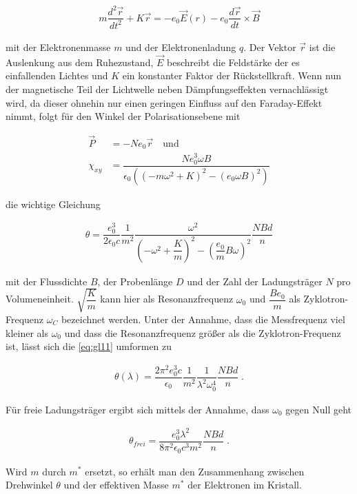     \begin{align*}
    m\dfrac{d^2\vec{r}}{dt^2}+K\vec{r}=-e_0\vec{E}(r)-e_0\dfrac{d\vec{r}}{dt}\times\vec{B}
    \end{align*}

    mit der Elektronenmasse $m$ und der Elektronenladung $q$. Der Vektor $\vec{r}$ ist die Auslenkung aus dem Ruhezustand, $\vec{E}$ beschreibt die Feldstärke der es einfallenden Lichtes und $K$ ein konstanter Faktor der Rückstellkraft.
    Wenn nun der magnetische Teil der Lichtwelle neben Dämpfungseffekten vernachlässigt wird, da dieser ohnehin nur einen geringen Einfluss auf den Faraday-Effekt nimmt, folgt für den Winkel der Polarisationsebene mit
   

    \begin{align*}
    \vec{P}&=-Ne_0\vec{r} \quad \text{und}\\
    \chi_{xy}&=\dfrac{Ne_0^3\omega B}{\epsilon_0\left(\left(-m\omega^2+K\right)^2-\left(e_0\omega B\right)^2\right)}
    \end{align*}

    die wichtige Gleichung

    \begin{align}
    \label{eq:gl11}
    \theta=\dfrac{e_0^3}{2\epsilon_0 c}\dfrac{1}{m^2}\dfrac{\omega^2}{\left(-\omega^2+\dfrac{K}{m}\right)^2 -\left(\dfrac{e_0}{m}B\omega\right)^2}  \dfrac{NBd}{n}
    \end{align}

    mit der Flussdichte $B$, der Probenlänge $D$ und der Zahl der Ladungsträger $N$ pro Volumeneinheit. $\sqrt{\dfrac{K}{m}}$
    kann hier als Resonanzfrequenz $\omega_0$ und $\dfrac{Be_0}{m}$ als Zyklotron-Frequenz $\omega_C$ bezeichnet werden. 
    Unter der Annahme, dass die Messfrequenz viel kleiner als $\omega_0$ und dass die Resonanzfrequenz größer als die Zyklotron-Frequenz ist,
    lässt sich die \autoref{eq:gl11} umformen zu

    \begin{align*}
    \theta(\lambda)=\dfrac{2\pi^2 e_0^3 c}{\epsilon_0}\dfrac{1}{m^2}\dfrac{1}{\lambda^2 \omega_0^4}\dfrac{NBd}{n}\; .
    \end{align*}

    Für freie Ladungsträger ergibt sich mittels der Annahme, dass $\omega_0$ gegen Null geht

    \begin{align}
    \label{eq:gl12}
    \theta_{frei}=\dfrac{e_0^3\lambda^2}{8 \pi^2 \epsilon_0 c^3 m^2 }\dfrac{NBd}{n}\; .
    \end{align}

    Wird $m$ durch $m^*$ ersetzt, so erhält man den Zusammenhang zwischen Drehwinkel $\theta$ und der effektiven Masse $m^*$
    der Elektronen im Kristall.

    \newpage